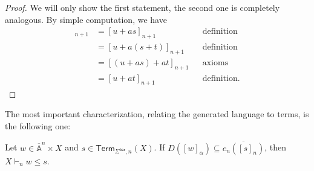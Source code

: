 \documentclass[a4paper,UKenglish,cleveref,thm-restate,numberwithinsect,final]{lipics-v2021}
\newcommand{\Br}{\mathsf{bar}}
\newcommand{\Term}{\mathsf{Term}}
\newcommand{\Names}{\mathbb{A}}
\newcommand{\barNames}{\overline{\Names}}
\theoremstyle{plain}
\numberwithin{equation}{section}
\newcommand{\+}[1]{\mathcal{#1}\xspace}
\theoremstyle{definition}
\begin{document}
\begin{proof}
  We will only show the first statement, the second one is completely analogous.
  By simple computation, we have
  \begin{align*}
    [u]_{n + 1}
    &= [u + as]_{n + 1} && \text{definition} \\
    &= [u + a(s + t)]_{n + 1} && \text{definition} \\
    &= [(u + as) + at]_{n + 1} && \text{axioms} \\
    &= [u + at]_{n + 1} && \text{definition}.
  \end{align*}
\end{proof}

The most important characterization, relating the generated language to terms, is the following one:

\begin{lemma}\label{lem:language-subset-inequality}
  Let \(w \in \barNames^n \times X\) and \(s \in \Term_{\Sigma^\Br, n}(X)\).
  If \(D([w]_\alpha) \subseteq \overline{e_n([s]_n)}\), then \(X \vdash_n w \le s\).
\end{lemma}
\end{document}
